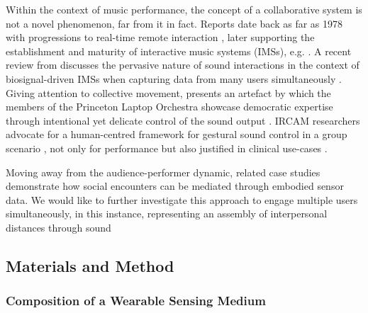 
Within the context of music performance, the concept of a collaborative system is not a novel phenomenon, far from it in fact. Reports date back as far as 1978 \citep{bischoff_music_1978} with progressions to real-time remote interaction \citep{barbosa_displaced_2003}, later supporting the establishment and maturity of interactive music systems (IMSs), e.g. \citep{jorda_reactable_2007,freeman_auracle_2005}. A recent review from \citeauthor{aly_appropriating_2021} discusses the pervasive nature of sound interactions in the context of biosignal-driven IMSs when capturing data from many users simultaneously \cite{aly_appropriating_2021}. Giving attention to collective movement, \citeauthor{hege_spirit_2014} presents an artefact by which the members of the Princeton Laptop Orchestra showcase democratic expertise through intentional yet delicate control of the sound output \cite{hege_spirit_2014}. IRCAM researchers advocate for a human-centred framework for gestural sound control in a group scenario \citep{schnell_collective_2015}, not only for performance but also justified in clinical use-cases \citep{bevilacqua_exploring_2018}.

Moving away from the audience-performer dynamic, related case studies \citep{roo_physio-stacks_2020,howell_life-affirming_2019,ashford_eeg_2019} demonstrate how social encounters can be mediated through embodied sensor data. We would like to further investigate this approach to engage multiple users simultaneously, in this instance, representing an assembly of interpersonal distances through sound

\subsection{Materials and Method}
\label{sec3:method}

\subsubsection{Composition of a Wearable Sensing Medium}
\label{sec3.1:tech_composition}

